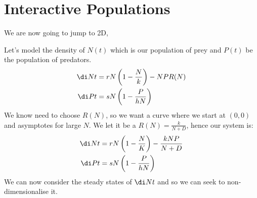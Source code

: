 \section{Interactive Populations}
We are now going to jump to 2D,
\begin{eg}
  Let's model the density of  $N(t)$ which is our population of prey and $P(t)$ be the population of predators.
  \begin{align*}
    \di N t &= rN\left( 1 - \frac{N }{k} \right) - NPR(N)\\
    \di P t &= sN \left( 1 - \frac{P }{hN} \right)
  \end{align*}
  We know need to choose $R(N)$, so we want a curve where we start at $(0, 0)$ and asymptotes for large $N$. We let it be a $R(N) = \frac{k }{N + D}$, hence our system is:
  \begin{align*}
    \di N t &= rN\left( 1 - \frac{N }{K} \right) - \frac{kNP}{N + D}\\
    \di P t &= sN \left( 1 - \frac{P }{hN} \right)
  \end{align*}
  We can now consider the steady states of $\di N t$ and so we can seek to non-dimensionalise it.
\end{eg}
